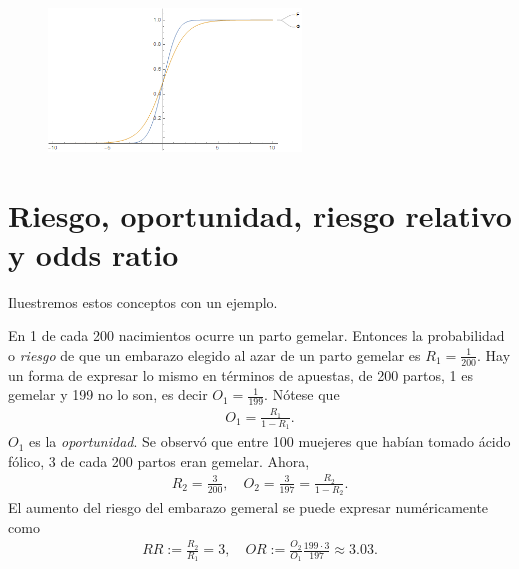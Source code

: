 \begin{figure}[h]
    \centering
    \includegraphics[width=0.6\textwidth]{imagenes3/logit.png}
\end{figure}

\section{Riesgo, oportunidad, riesgo relativo y odds ratio}
Iluestremos estos conceptos con un ejemplo.
\begin{ejemplo}
    En 1 de cada 200 nacimientos ocurre un parto gemelar. Entonces la probabilidad o \textit{riesgo} de que un embarazo elegido al azar de un parto gemelar es $R_1 = \frac{1}{200}$. Hay un forma de expresar lo mismo en términos de apuestas, de 200 partos, 1 es gemelar y 199 no lo son, es decir $O_1 = \frac{1}{199}$. Nótese que
    \begin{align*}
        O_1 = \frac{R_1}{1-R_1}.
    \end{align*}
    $O_1$ es la \textit{oportunidad}. Se observó que entre 100 muejeres que habían tomado ácido fólico, 3 de cada 200 partos eran gemelar. Ahora,
    \begin{align*}
        R_2 = \frac{3}{200}, \quad O_2 = \frac{3}{197} = \frac{R_2}{1-R_2}.
    \end{align*}
    El aumento del riesgo del embarazo gemeral se puede expresar numéricamente como
    \begin{align*}
        RR :=  \frac{R_2}{R_1} = 3, \quad OR:= \frac{O_2}{O_1} \frac{199 \cdot 3}{197} \approx 3.03.
    \end{align*}
\end{ejemplo}

